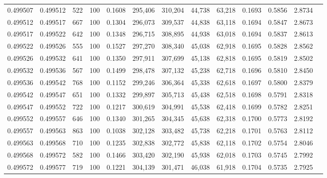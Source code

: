 \begin{tabular}{rrrrrrrrrrrrr}
0.499507 & 0.499512 &   522 & 100 &                                     0.1608 & 295,406 & 310,204 &  44,738 &  63,218 & 0.1693 & 0.5856 & 2.8734 \\
0.499512 & 0.499517 &   667 & 100 &                                     0.1304 & 296,073 & 309,537 &  44,838 &  63,118 & 0.1694 & 0.5847 & 2.8673 \\
0.499517 & 0.499522 &   642 & 100 &                                     0.1348 & 296,715 & 308,895 &  44,938 &  63,018 & 0.1694 & 0.5837 & 2.8613 \\
0.499522 & 0.499526 &   555 & 100 &                                     0.1527 & 297,270 & 308,340 &  45,038 &  62,918 & 0.1695 & 0.5828 & 2.8562 \\
0.499526 & 0.499532 &   641 & 100 &                                     0.1350 & 297,911 & 307,699 &  45,138 &  62,818 & 0.1695 & 0.5819 & 2.8502 \\
0.499532 & 0.499536 &   567 & 100 &                                     0.1499 & 298,478 & 307,132 &  45,238 &  62,718 & 0.1696 & 0.5810 & 2.8450 \\
0.499536 & 0.499542 &   768 & 100 &                                     0.1152 & 299,246 & 306,364 &  45,338 &  62,618 & 0.1697 & 0.5800 & 2.8379 \\
0.499542 & 0.499547 &   651 & 100 &                                     0.1332 & 299,897 & 305,713 &  45,438 &  62,518 & 0.1698 & 0.5791 & 2.8318 \\
0.499547 & 0.499552 &   722 & 100 &                                     0.1217 & 300,619 & 304,991 &  45,538 &  62,418 & 0.1699 & 0.5782 & 2.8251 \\
0.499552 & 0.499557 &   646 & 100 &                                     0.1340 & 301,265 & 304,345 &  45,638 &  62,318 & 0.1700 & 0.5773 & 2.8192 \\
0.499557 & 0.499563 &   863 & 100 &                                     0.1038 & 302,128 & 303,482 &  45,738 &  62,218 & 0.1701 & 0.5763 & 2.8112 \\
0.499563 & 0.499568 &   710 & 100 &                                     0.1235 & 302,838 & 302,772 &  45,838 &  62,118 & 0.1702 & 0.5754 & 2.8046 \\
0.499568 & 0.499572 &   582 & 100 &                                     0.1466 & 303,420 & 302,190 &  45,938 &  62,018 & 0.1703 & 0.5745 & 2.7992 \\
0.499572 & 0.499577 &   719 & 100 &                                     0.1221 & 304,139 & 301,471 &  46,038 &  61,918 & 0.1704 & 0.5735 & 2.7925 \\

\end{tabular}
